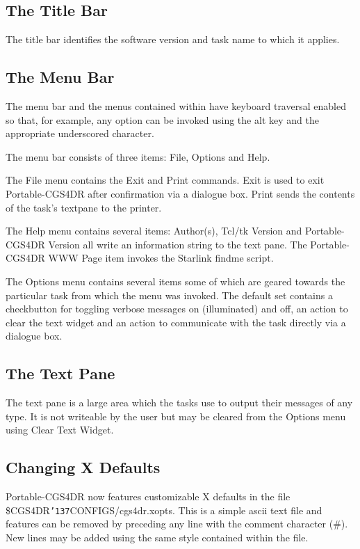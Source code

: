 \documentclass[a4paper]{book}
\renewcommand{\_}{{\tt\char'137}}
\begin{document}
\subsection{The Title Bar}
The title bar identifies the software version and task name to which it applies.

\subsection{The Menu Bar}
The menu bar and the menus contained within have keyboard traversal enabled so that, for example, any option
can be invoked using the {\sc alt} key and the appropriate underscored character.

The menu bar consists of three items: {\sf File}, {\sf Options} and {\sf Help}.

The {\sf File} menu contains the {\sf Exit} and {\sf Print} commands. {\sf Exit} is used to exit Portable-CGS4DR after confirmation
via a dialogue box. {\sf Print} sends the contents of the task's textpane to the printer.

The {\sf Help} menu contains several items: {\sf Author(s)}, {\sf Tcl/tk Version} and {\sf Portable-CGS4DR Version}
all write an information string to the text pane. The {\sf Portable-CGS4DR WWW Page} item invokes the Starlink findme script.

The {\sf Options} menu contains several items some of which are geared towards the particular task from
which the menu was invoked. The default set contains a checkbutton for toggling verbose messages on (illuminated)
and off, an action to clear the text widget and an action to communicate with the task directly via a dialogue box.

\subsection{The Text Pane}
The text pane is a large area which the tasks use to output their
messages of any type. It is not writeable by the user but may be
cleared from the {\sf Options} menu using {\sf Clear Text Widget}.

\subsection{Changing X Defaults}
Portable-CGS4DR now features customizable X defaults in the file \$CGS4DR\_CONFIGS/cgs4dr.xopts.
This is a simple {\sc ascii} text file and features can be removed by preceding any line with the
comment character (\#). New lines may be added using the same style contained within the file.
\end{document}
